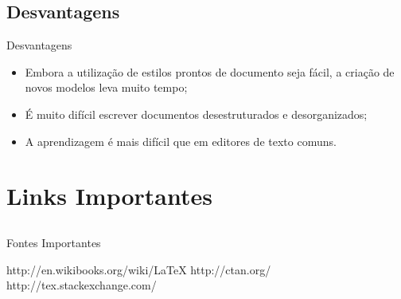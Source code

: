 \subsection{Desvantagens}

\begin{frame}{Desvantagens}
\begin{itemize}
    \item Embora a utilização de estilos prontos de documento seja fácil, a criação de novos modelos leva muito tempo;
    \item É muito difícil escrever documentos desestruturados e desorganizados;
    \item A aprendizagem é mais difícil que em editores de texto comuns.
\end{itemize}
\end{frame}

\section{Links Importantes}
\subsection{}
\begin{frame}{Fontes Importantes}
  \begin{thebibliography}{10}
  \beamertemplatearticlebibitems
    http://en.wikibooks.org/wiki/LaTeX
    \newblock \href{http://en.wikibooks.org/wiki/LaTeX}{}
    http://ctan.org/
    \newblock \href{http://ctan.org/}{}
    http://tex.stackexchange.com/
    \newblock \href{http://tex.stackexchange.com/}{}
  \end{thebibliography}
\end{frame}

% 